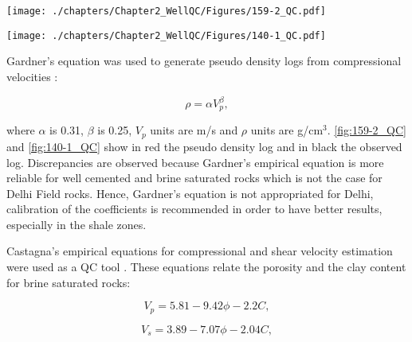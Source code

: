 \begin{sidewaysfigure}
\centering
\scalebox{0.5}
{\texttt{[image: ./chapters/Chapter2\_WellQC/Figures/159-2\_QC.pdf]}}
\caption{Caliper, gamma ray, density and sonic logs of well 159-2. The black color indicates
the observed logs while red color indicates pseudo logs. Gasmmann's equation was used
to generate the density pseudo log. Castagna's equations were used to calculate compressional
and shear velocity.} 
\label{fig:159-2_QC}
\end{sidewaysfigure}

\begin{sidewaysfigure}
\centering
\scalebox{0.5}
{\texttt{[image: ./chapters/Chapter2\_WellQC/Figures/140-1\_QC.pdf]}}
\caption{Caliper, gamma ray, density and sonic logs of well 140-1. The black color indicates
the observed logs while red color indicates pseudo logs. Gasmmann's equation was used
to generate the density pseudo log. Castagna's equations were used to calculate compressional
and shear velocity.} 
\label{fig:140-1_QC}
\end{sidewaysfigure}


Gardner's equation was used to generate pseudo density logs from compressional velocities
\citep{ref:gardner}:

\begin{equation}
\rho=\alpha V_{p}^{\beta},
  \label{eq:gardner}
\end{equation}

where $\alpha$ is 0.31, $\beta$ is 0.25, $V_{p}$ units are m/s and $\rho$ units are
g/cm$^3$. \ref{fig:159-2_QC} and \ref{fig:140-1_QC} show in red the pseudo density log
and in black the observed log. Discrepancies are observed because Gardner's empirical equation
is more reliable  for well cemented and brine saturated rocks which is not the case 
for Delhi Field rocks. Hence, Gardner's equation is not appropriated for Delhi, calibration of the 
coefficients is recommended in order to have better results, especially in the shale zones. 

Castagna's empirical equations for compressional and shear velocity estimation
were used as a QC tool \citep{ref:castagna}. These equations relate the porosity and the clay 
content for brine saturated rocks:

\begin{equation}
V_{p}=5.81-9.42\phi-2.2C,
  \label{eq:castagna1}
\end{equation}

\begin{equation}
V_{s}=3.89-7.07\phi-2.04C,
  \label{eq:castagna2}
\end{equation}

